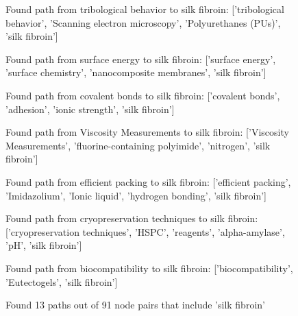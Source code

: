 \begin{figure}[htbp]
\begin{mdframed}
    Found path from tribological behavior to silk fibroin: ['tribological behavior', 'Scanning electron microscopy', 'Polyurethanes (PUs)', 'silk fibroin']
    
    Found path from surface energy to silk fibroin: ['surface energy', 'surface chemistry', 'nanocomposite membranes', 'silk fibroin']
    
    Found path from covalent bonds to silk fibroin: ['covalent bonds', 'adhesion', 'ionic strength', 'silk fibroin']
    
    Found path from Viscosity Measurements to silk fibroin: ['Viscosity Measurements', 'fluorine-containing polyimide', 'nitrogen', 'silk fibroin']
    
    Found path from efficient packing to silk fibroin: ['efficient packing', 'Imidazolium', 'Ionic liquid', 'hydrogen bonding', 'silk fibroin']
    
    Found path from cryopreservation techniques to silk fibroin: ['cryopreservation techniques', 'HSPC', 'reagents', 'alpha-amylase', 'pH', 'silk fibroin']
    
    Found path from biocompatibility to silk fibroin: ['biocompatibility', 'Eutectogels', 'silk fibroin']
    
    Found 13 paths out of 91 node pairs that include 'silk fibroin'
    
    \textbf{}
    

\end{mdframed}
\end{figure}
